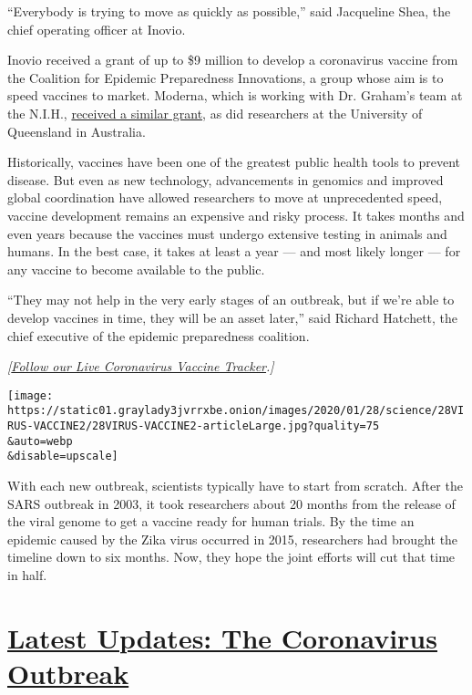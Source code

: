 ``Everybody is trying to move as quickly as possible,'' said Jacqueline
Shea, the chief operating officer at Inovio.

Inovio received a grant of up to \$9 million to develop a coronavirus
vaccine from the Coalition for Epidemic Preparedness Innovations, a
group whose aim is to speed vaccines to market. Moderna, which is
working with Dr. Graham's team at the N.I.H.,
\href{https://cepi.net/news_cepi/cepi-to-fund-three-programmes-to-develop-vaccines-against-the-novel-coronavirus-ncov-2019/}{received
a similar grant}, as did researchers at the University of Queensland in
Australia.

Historically, vaccines have been one of the greatest public health tools
to prevent disease. But even as new technology, advancements in genomics
and improved global coordination have allowed researchers to move at
unprecedented speed, vaccine development remains an expensive and risky
process. It takes months and even years because the vaccines must
undergo extensive testing in animals and humans. In the best case, it
takes at least a year --- and most likely longer --- for any vaccine to
become available to the public.

``They may not help in the very early stages of an outbreak, but if
we're able to develop vaccines in time, they will be an asset later,''
said Richard Hatchett, the chief executive of the epidemic preparedness
coalition.

\emph{{[}}\href{https://www.nytimes3xbfgragh.onion/interactive/2020/science/coronavirus-vaccine-tracker.html}{\emph{Follow
our Live Coronavirus Vaccine Tracker}}\emph{.{]}}

\texttt{[image: https://static01.graylady3jvrrxbe.onion/images/2020/01/28/science/28VIRUS-VACCINE2/28VIRUS-VACCINE2-articleLarge.jpg?quality=75\\\&auto=webp\\\&disable=upscale]}

With each new outbreak, scientists typically have to start from scratch.
After the SARS outbreak in 2003, it took researchers about 20 months
from the release of the viral genome to get a vaccine ready for human
trials. By the time an epidemic caused by the Zika virus occurred in
2015, researchers had brought the timeline down to six months. Now, they
hope the joint efforts will cut that time in half.

\hypertarget{latest-updates-the-coronavirus-outbreak}{%
\section{\texorpdfstring{\href{https://www.nytimes3xbfgragh.onion/2020/09/11/world/covid-19-coronavirus.html?action=click\&pgtype=Article\&state=default\&region=MAIN_CONTENT_1\&context=storylines_live_updates}{Latest
Updates: The Coronavirus
Outbreak}}{Latest Updates: The Coronavirus Outbreak}}\label{latest-updates-the-coronavirus-outbreak}}

